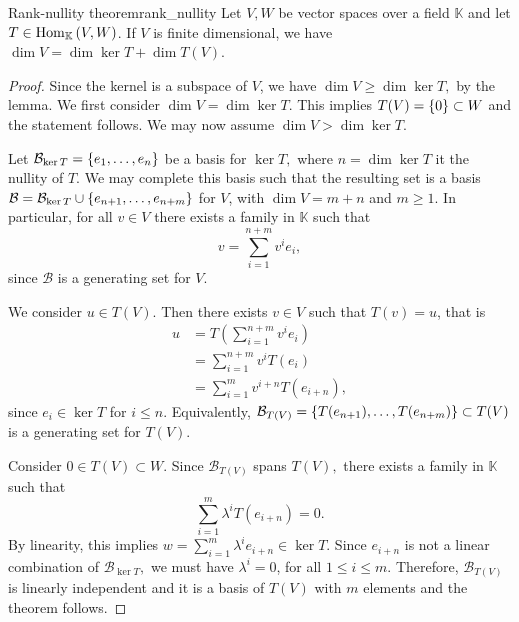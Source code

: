 \begin{theorem}{Rank-nullity theorem}{rank_nullity}
    Let \(V, W\) be vector spaces over a field \(\mathbb{K}\) and let \(T \in \Hom[\mathbb{K}]{V,W}\). If \(V\) is finite dimensional, we have \(\dim V = \dim \ker T + \dim T(V)\).
\end{theorem}
\begin{proof}
    Since the kernel is a subspace of \(V\), we have \(\dim V \geq \dim \ker T,\) by the lemma. We first consider \(\dim V = \dim \ker T\). This implies \(T(V) = \set {0} \subset W\) and the statement follows. We may now assume \(\dim V > \dim \ker T\).

    Let \(\mathcal{B}_{\ker T} = \set{e_1, \dots, e_n}\) be a basis for \(\ker T,\) where \(n = \dim\ker T\) it the nullity of \(T\). We may complete this basis such that the resulting set is a basis \(\mathcal{B} = \mathcal{B}_{\ker T} \cup \set{e_{n+1}, \dots, e_{n+m}}\) for \(V\), with \(\dim V = m + n\) and \(m \geq 1\). In particular, for all \(v \in V\) there exists a family  in \(\mathbb{K}\) such that
    \begin{equation*}
        v = \sum_{i=1}^{n+m} v^ie_i,
    \end{equation*}
    since \(\mathcal{B}\) is a generating set for \(V\).

    We consider \(u \in T(V)\). Then there exists \(v \in V\) such that \(T(v) = u\), that is
    \begin{align*}
        u &= T\left(\sum_{i=1}^{n+m} v^ie_i\right)\\
          &= \sum_{i=1}^{n+m} v^i T(e_i)\\
          &= \sum_{i=1}^{m} v^{i+n} T(e_{i+n}),
    \end{align*}
    since \(e_i \in \ker T\) for \(i \leq n\). Equivalently, \(\mathcal{B}_{T(V)} = \set{T(e_{n+1}), \dots, T(e_{n+m})} \subset T(V)\) is a generating set for \(T(V)\).

    Consider \(0 \in T(V) \subset W\). Since \(\mathcal{B}_{T(V)}\) spans \(T(V),\) there exists a family  in \(\mathbb{K}\) such that
    \begin{equation*}
        \sum_{i=1}^m \lambda^i T(e_{i+n}) = 0.
    \end{equation*}
    By linearity, this implies \(w = \sum_{i=1}^m \lambda^ie_{i+n} \in \ker T\). Since \(e_{i+n}\) is not a linear combination of \(\mathcal{B}_{\ker T},\) we must have \(\lambda^i = 0\), for all \(1 \leq i \leq m\). Therefore, \(\mathcal{B}_{T(V)}\) is linearly independent and it is a basis of \(T(V)\) with \(m\) elements and the theorem follows.
\end{proof}
